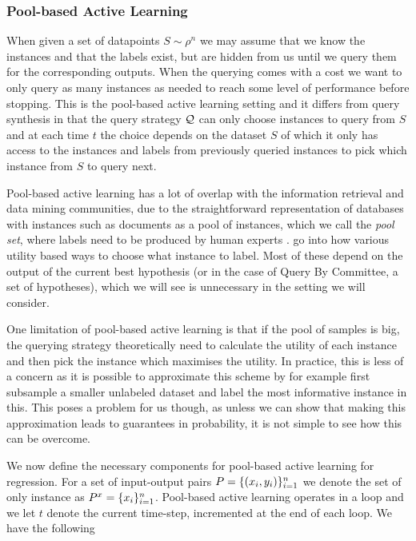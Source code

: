 \subsubsection{Pool-based Active Learning}
When given a set of datapoints \(S \sim \rho^{n}\) we may assume that we know
the instances and that the labels exist, but are hidden from us until we query
them for the corresponding outputs. When the querying comes with a cost we want
to only query as many instances as needed to reach some level of performance
before stopping. This is the pool-based active learning setting \citep{lewis94}
and it differs from query synthesis in that the query strategy \(\mathcal{Q}\)
can only choose instances to query from \(S\) and at each time \(t\) the choice
depends on the dataset \(S\) of which it only has access to the instances and
labels from previously queried instances to pick which instance from \(S\) to
query next.

Pool-based active learning has a lot of overlap with the information retrieval
and data mining communities, due to the straightforward representation of
databases with instances such as documents as a pool of instances, which we call
the \textit{pool set}, where labels need to be produced by human experts
\citep{lewis94,tong01_suppor_vector_machin_activ_learn}. \citep{settles08} go into
how various utility based ways to choose what instance to label. Most of these
depend on the output of the current best hypothesis (or in the case of Query By
Committee, a set of hypotheses), which we will see is unnecessary in the setting
we will consider.

One limitation of pool-based active learning is that if the pool of samples is
big, the querying strategy theoretically need to calculate the utility of each
instance and then pick the instance which maximises the utility. In practice,
this is less of a concern as it is possible to approximate this scheme by for
example first subsample a smaller unlabeled dataset and label the most
informative instance in this. This poses a problem for us though, as unless we
can show that making this approximation leads to guarantees in probability, it is
not simple to see how this can be overcome.

We now define the necessary components for pool-based active learning for
regression. For a set of input-output pairs \(P = \{(x_{i},
y_{i})\}_{i=1}^{n}\) we denote the set of only instance as \(P^x =
\{x_{i}\}_{i=1}^{n}\). Pool-based active learning operates in a loop and we let
\(t\) denote the current time-step, incremented at the end of each loop. We have
the following

